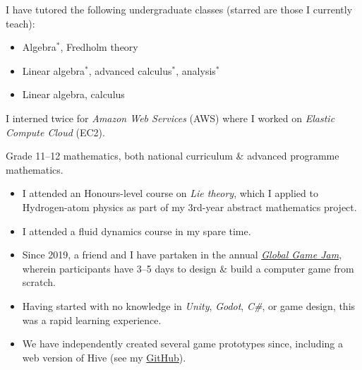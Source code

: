 \smallskip
I have tutored the following undergraduate classes (starred are those I currently teach):
\medskip
\begin{itemize}
\item {} Algebra$^*$, Fredholm theory
\item {} Linear algebra$^*$, advanced calculus$^*$, analysis$^*$
\item {} Linear algebra, calculus
\end{itemize}

\divider %

\smallskip
I interned twice for \textit{Amazon Web Services} (AWS) where I worked on \textit{Elastic Compute Cloud} (EC2).

\divider %

\smallskip
Grade 11--12 mathematics, both national curriculum \& advanced programme mathematics.


\begin{itemize}
\item I attended an Honours-level course on \textit{Lie theory}, which I applied to Hydrogen-atom physics as part of my 3rd-year abstract mathematics project.
\item I attended a fluid dynamics course in my spare time.
\end{itemize}
\smallskip

\begin{itemize}
\item Since 2019, a friend and I have partaken in the annual \href{https://globalgamejam.org/about}{\emph{Global Game Jam}}, wherein participants have 3--5
    days to design \& build a computer game from scratch.
\item Having started with no knowledge in \emph{Unity}, \emph{Godot}, \emph{C\#}, or game design, this was a rapid learning experience.
\item We have independently created several game prototypes since, including a web version of Hive (see my \href{https://github.com/Doormango}{GitHub}).
\end{itemize}
\smallskip

